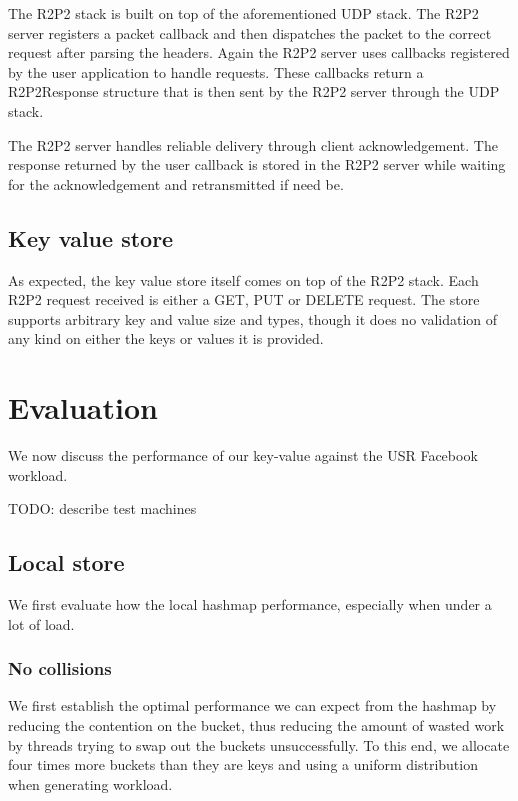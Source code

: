 \documentclass[11pt]{article}
\begin{document}
The R2P2 stack is built on top of the aforementioned UDP stack. The
R2P2 server registers a packet callback and then dispatches the packet
to the correct request after parsing the headers. Again the R2P2
server uses callbacks registered by the user application to handle
requests. These callbacks return a R2P2Response structure that is then
sent by the R2P2 server through the UDP stack.

The R2P2 server handles reliable delivery through client
acknowledgement. The response returned by the user callback is stored
in the R2P2 server while waiting for the acknowledgement and
retransmitted if need be.

\subsection{Key value store}

As expected, the key value store itself comes on top of the R2P2
stack. Each R2P2 request received is either a GET, PUT or DELETE
request. The store supports arbitrary key and value size and types,
though it does no validation of any kind on either the keys or values
it is provided.

\section{Evaluation}

We now discuss the performance of our key-value against the USR
Facebook workload.

TODO: describe test machines

\subsection{Local store}

We first evaluate how the local hashmap performance, especially when
under a lot of load.

\subsubsection{No collisions}

We first establish the optimal performance we can expect from the
hashmap by reducing the contention on the bucket, thus reducing the
amount of wasted work by threads trying to swap out the buckets
unsuccessfully. To this end, we allocate four times more buckets than
they are keys and using a uniform distribution when generating
workload.
\end{document}
